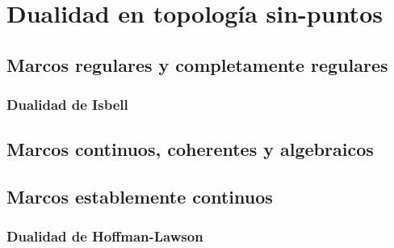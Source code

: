 \chapter{Dualidad en topología sin-puntos}

\section{Marcos regulares y completamente regulares}
\subsection{Dualidad de Isbell}
\section{Marcos continuos, coherentes y algebraicos}
\section{Marcos establemente continuos}
\subsection{Dualidad de Hoffman-Lawson}

